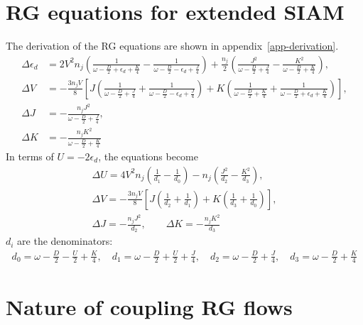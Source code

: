 \section{RG equations for extended SIAM}
The derivation of the RG equations are shown in appendix~\ref{app-derivation}.
\begin{equation}\begin{aligned}
	\Delta \epsilon_d &= 2V^2 n_j\left(\frac{1}{\omega - \frac{D}{2} + \epsilon_d + \frac{K}{4}} - \frac{1}{\omega - \frac{D}{2} - \epsilon_d + \frac{J}{4}}\right) + \frac{n_j}{2}\left(\frac{J^2}{\omega - \frac{D}{2} + \frac{J}{4}} - \frac{K^2}{\omega - \frac{D}{2} + \frac{K}{4}}\right),\\
	\Delta V &= -\frac{3n_j V}{8}\left[J\left(\frac{1}{\omega - \frac{D}{2} + \frac{J}{4}} + \frac{1}{\omega - \frac{D}{2} - \epsilon_d + \frac{J}{4}}\right) + K \left(\frac{1}{\omega - \frac{D}{2} + \frac{K}{4}} + \frac{1}{\omega - \frac{D}{2} + \epsilon_d + \frac{K}{4}}\right)\right],\\
	\Delta J &= -\frac{n_j J^2}{\omega - \frac{D}{2} + \frac{J}{4}},\\ 
	\Delta K &= -\frac{n_j K^2}{\omega - \frac{D}{2} + \frac{K}{4}}
\end{aligned}\end{equation}
In terms of \(U = -2\epsilon_d\), the equations become
\begin{gather}
	\Delta U = 4V^2 n_j\left(\frac{1}{d_1} - \frac{1}{d_0}\right) - n_j\left(\frac{J^2}{d_2} - \frac{K^2}{d_3}\right),\\
	\Delta V = -\frac{3n_j V}{8}\left[J\left(\frac{1}{d_2} + \frac{1}{d_1}\right) + K \left(\frac{1}{d_3} + \frac{1}{d_0}\right)\right],\\
	\Delta J = -\frac{n_j J^2}{d_2}, \quad\quad\Delta K = -\frac{n_j K^2}{d_3}
\end{gather}
\(d_i\) are the denominators:
\begin{equation}\begin{aligned}
	\label{denominators}
	d_0 = \omega - \frac{D}{2} - \frac{U}{2} + \frac{K}{4}, \quad d_1 = \omega - \frac{D}{2} + \frac{U}{2} + \frac{J}{4}, \quad d_2 = \omega - \frac{D}{2} + \frac{J}{4}, \quad d_3 = \omega - \frac{D}{2} + \frac{K}{4}
\end{aligned}\end{equation}

\section{Nature of coupling RG flows}
